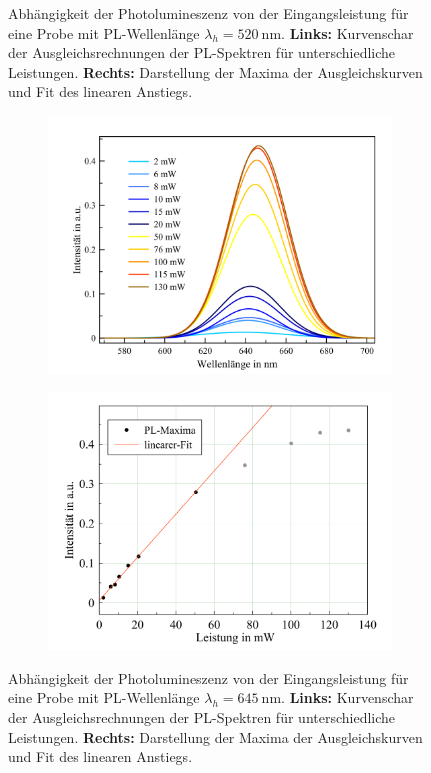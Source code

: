 \begin{figure}[H]
\begin{subfigure}{0.45\textwidth}
  \end{subfigure}
  \caption{Abhängigkeit der Photolumineszenz von der Eingangsleistung für eine Probe mit PL-Wellenlänge $\lambda_h = \SI{520}{\nano\meter}$.
  \textbf{Links:} Kurvenschar der Ausgleichsrechnungen der PL-Spektren für unterschiedliche Leistungen. \textbf{Rechts:} Darstellung der Maxima der Ausgleichskurven und Fit des linearen Anstiegs.}
  \label{fig:Podep520}
\end{figure}
\begin{figure}[H]
  \centering
  \begin{subfigure}{0.49\textwidth}
    \includegraphics[width=\textwidth]{plots/Powerdependence_645nm.png}
  \end{subfigure}
  \begin{subfigure}{0.46\textwidth}
    \includegraphics[width=\textwidth]{plots/Powerdepfit_645.png}
  \end{subfigure}
  \caption{Abhängigkeit der Photolumineszenz von der Eingangsleistung für eine Probe mit PL-Wellenlänge $\lambda_h = \SI{645}{\nano\meter}$. \textbf{Links:} Kurvenschar der Ausgleichsrechnungen der PL-Spektren für unterschiedliche Leistungen. \textbf{Rechts:} Darstellung der Maxima der Ausgleichskurven und Fit des linearen Anstiegs.}
  \label{fig:Podep645}
\end{figure}

